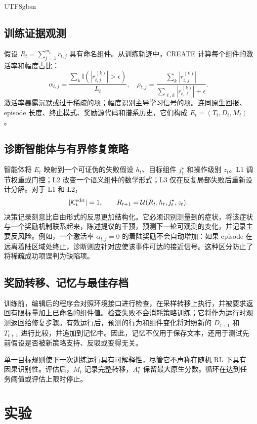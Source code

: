 \documentclass[conference]{IEEEtran}
\begin{document}
\begin{CJK}{UTF8}{gbsn}
\subsection{训练证据观测}
假设 $R_t=\sum_{j=1}^{m_t}r_{t,j}$ 具有命名组件。从训练轨迹中，CREATE 计算每个组件的激活率和幅度占比：
\begin{equation}
\alpha_{t,j}=\frac{\sum_k\mathbb{I}(|r_{t,j}^{(k)}|>\epsilon)}{L_t},
\quad
\rho_{t,j}=\frac{\sum_k|r_{t,j}^{(k)}|}
{\sum_{\ell,k}|r_{t,\ell}^{(k)}|+\epsilon}.
\label{eq:evidence}
\end{equation}
激活率暴露沉默或过于稀疏的项；幅度识别主导学习信号的项。连同原生回报、episode 长度、终止模式、奖励源代码和谱系历史，它们构成 $E_t=(T_t,D_t,M_t)$。

\subsection{诊断智能体与有界修复策略}
智能体将 $E_t$ 映射到一个可证伪的失败假设 $h_t$、目标组件 $j_t^\star$ 和操作级别 $z_t$。L1 调节权重或门控；L2 改变一个语义组件的数学形式；L3 仅在反复局部失败后重新设计分解。对于 L1 和 L2，
\begin{equation}
|\mathcal{K}^{\rm edit}_t|=1,\qquad
R_{t+1}=\mathcal{U}(R_t,h_t,j_t^\star,z_t).
\label{eq:update}
\end{equation}
决策记录刻意比自由形式的反思更加结构化。它必须识别测量到的症状，将该症状与一个奖励机制联系起来，陈述提议的干预，预测下一轮可观测的变化，并记录主要反风险。例如，一个激活率 $\alpha_{t,j}=0$ 的着陆奖励不会自动增加：如果 episode 在远离着陆区域处终止，诊断则应针对应使该事件可达的接近信号。这种区分防止了将稀疏成功项误判为缺陷项。

\subsection{奖励转移、记忆与最佳存档}
训练前，编辑后的程序会对照环境接口进行检查，在采样转移上执行，并被要求返回有限标量加上已命名的组件值。检查失败不会消耗策略训练；它将作为运行时观测返回给修复步骤。有效运行后，预测的行为和组件变化将对照新的 $D_{t+1}$ 和 $T_{t+1}$ 进行比较，并追加到记忆中。因此，记忆不仅用于保存文本，还用于测试先前假设是否被新策略支持、反驳或变得无关。

单一目标规则使下一次训练运行具有可解释性，尽管它不声称在随机 RL 下具有因果识别性。评估后，$M_t$ 记录完整转移，$A_t^\star$ 保留最大原生分数。循环在达到任务阈值或评估上限时停止。

\section{实验}


\end{CJK}
\end{document}
